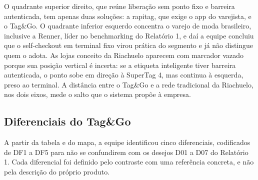 \begin{figure}[htbp]
\end{figure}

O quadrante superior direito, que reúne liberação sem ponto fixo e barreira autenticada, tem apenas duas soluções: a rapitag, que exige o app do varejista, e o Tag\&Go. O quadrante inferior esquerdo concentra o varejo de moda brasileiro, inclusive a Renner, líder no benchmarking do Relatório 1, e daí a equipe concluiu que o self-checkout em terminal fixo virou prática do segmento e já não distingue quem o adota. As lojas conceito da Riachuelo aparecem com marcador vazado porque sua posição vertical é incerta: se a etiqueta inteligente tiver barreira autenticada, o ponto sobe em direção à SuperTag 4, mas continua à esquerda, preso ao terminal. A distância entre o Tag\&Go e a rede tradicional da Riachuelo, nos dois eixos, mede o salto que o sistema propõe à empresa.

\subsection{Diferenciais do Tag\&Go}
\label{sub:r2-dif-diferenciais}

A partir da tabela e do mapa, a equipe identificou cinco diferenciais, codificados de DF1 a DF5 para não se confundirem com os desejos D01 a D07 do Relatório 1. Cada diferencial foi definido pelo contraste com uma referência concreta, e não pela descrição do próprio produto.

